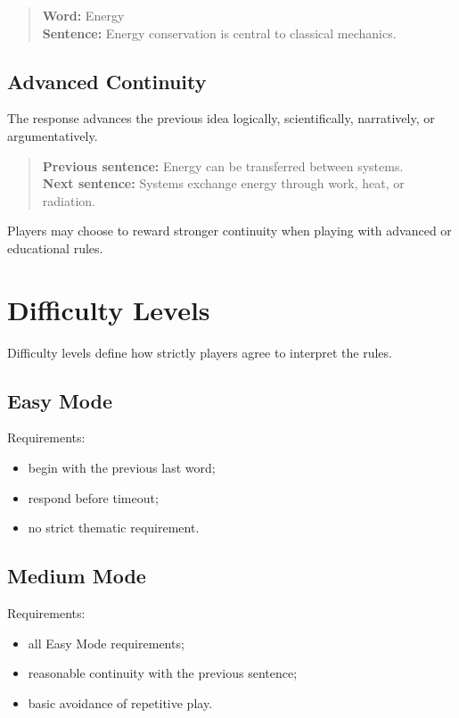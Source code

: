 \documentclass[11pt,a4paper]{article}
\begin{document}
\begin{quote}
\textbf{Word:} Energy\\
\textbf{Sentence:} Energy conservation is central to classical mechanics.
\end{quote}

\subsection{Advanced Continuity}

The response advances the previous idea logically, scientifically, narratively, or argumentatively.

\begin{quote}
\textbf{Previous sentence:} Energy can be transferred between systems.\\
\textbf{Next sentence:} Systems exchange energy through work, heat, or radiation.
\end{quote}

Players may choose to reward stronger continuity when playing with advanced or educational rules.

\section{Difficulty Levels}

Difficulty levels define how strictly players agree to interpret the rules.

\subsection{Easy Mode}

Requirements:

\begin{itemize}
    \item begin with the previous last word;
    \item respond before timeout;
    \item no strict thematic requirement.
\end{itemize}

\subsection{Medium Mode}

Requirements:

\begin{itemize}
    \item all Easy Mode requirements;
    \item reasonable continuity with the previous sentence;
    \item basic avoidance of repetitive play.
\end{itemize}
\end{document}
